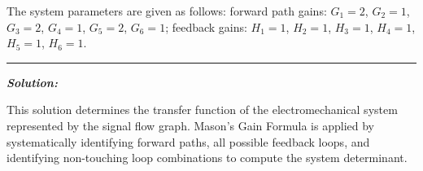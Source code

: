 \documentclass[11pt]{article}
\begin{document}
\noindent The system parameters are given as follows: forward path gains: \( G_1 = 2 \), \( G_2 = 1 \), \( G_3 = 2 \), \( G_4 = 1 \), \( G_5 = 2 \), \( G_6 = 1 \); feedback gains: \( H_1 = 1 \), \( H_2 = 1 \), \( H_3 = 1 \), \( H_4 = 1 \), \( H_5 = 1 \), \( H_6 = 1 \). \\
\noindent\rule{\textwidth}{1pt}

\vspace{12pt}   

\noindent \textbf{\textit{Solution:}}

\noindent This solution determines the transfer function of the electromechanical system represented by the signal flow graph. Mason's Gain Formula is applied by systematically identifying forward paths, all possible feedback loops, and identifying non-touching loop combinations to compute the system determinant.\\
\end{document}
